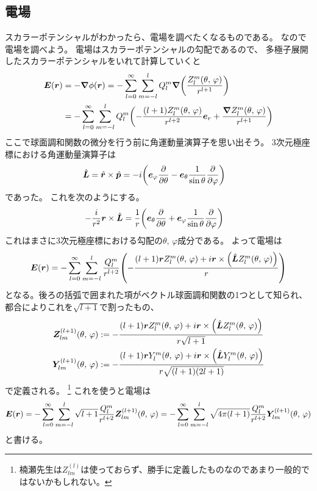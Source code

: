 \documentclass[../master.tex]{subfiles}
\begin{document}
\subsection{電場}
スカラーポテンシャルがわかったら、電場を調べたくなるものである。
なので電場を調べよう。
電場はスカラーポテンシャルの勾配であるので、
多極子展開したスカラーポテンシャルをいれて計算していくと
\begin{equation}\begin{aligned}[b]
    \vb*{E}(\vb*{r}) &= -\grad \phi(\vb*{r})
    = -\sum_{l=0}^{\infty} \sum_{m=-l}^{l} Q_l^m \grad\qty(\frac{Z_l^m(\theta,\,\varphi)}{r^{l+1}})\\
    &= -\sum_{l=0}^{\infty} \sum_{m=-l}^{l} Q_l^m \qty(-\frac{(l+1)Z_l^m(\theta,\,\varphi)}{r^{l+2}}\vb*{e}_r+\frac{\grad Z_l^m(\theta,\,\varphi)}{r^{l+1}})
\end{aligned}\end{equation}
ここで球面調和関数の微分を行う前に角運動量演算子を思い出そう。
3次元極座標における角運動量演算子は
\begin{align}
    \hat{\vb*{L}} &= \hat{\vb*{r}} \times \hat{\vb*{p}}
    = -i\qty(\vb*{e}_\varphi \pdv{\theta} -\vb*{e}_\theta \frac{1}{\sin\theta}\pdv{\varphi})
\end{align}
であった。
これを次のようにする。
\begin{align}
    -\frac{i}{r^2}\vb*{r} \times \hat{\vb*{L}} &= \frac{1}{r}\qty(\vb*{e}_\theta \pdv{\theta} +\vb*{e}_\varphi \frac{1}{\sin\theta}\pdv{\varphi})
\end{align}
これはまさに3次元極座標における勾配の\(\theta,\,\varphi\)成分である。
よって電場は
\begin{equation}
    \vb*{E}(\vb*{r}) = -\sum_{l=0}^{\infty} \sum_{m=-l}^{l}\frac{Q_l^m}{r^{l+2}}
    \qty(-\frac{(l+1)\vb*{r}Z_l^m(\theta,\,\varphi)+i\vb*{r}\times\qty(\hat{\vb*{L}}Z_l^m(\theta,\,\varphi))}{r})
\end{equation}
となる。後ろの括弧で囲まれた項がベクトル球面調和関数の1つとして知られ、
都合によりこれを\(\sqrt{l+1}\)で割ったもの、
\begin{align}
    \vb*{Z}_{lm}^{(l+1)}(\theta,\,\varphi) &:=-\frac{(l+1)\vb*{r}Z_l^m(\theta,\,\varphi)+i\vb*{r}\times\qty(\hat{\vb*{L}}Z_l^m(\theta,\,\varphi))}{r\sqrt{l+1}}\\
    \vb*{Y}_{lm}^{(l+1)}(\theta,\,\varphi) &:=-\frac{(l+1)\vb*{r}Y_l^m(\theta,\,\varphi)+i\vb*{r}\times\qty(\hat{\vb*{L}}Y_l^m(\theta,\,\varphi))}{r\sqrt{(l+1)(2l+1)}}\\
\end{align}
で定義される。
\footnote{楠瀬先生は\(Z_{lm}^{(l)}\)は使っておらず、勝手に定義したものなのであまり一般的ではないかもしれない。}
これを使うと電場は
\begin{align}
    \vb*{E}(\vb*{r})
    = -\sum_{l=0}^{\infty} \sum_{m=-l}^{l}\sqrt{l+1}\frac{Q_l^m}{r^{l+2}} \vb*{Z}_{lm}^{(l+1)}(\theta,\,\varphi)
    = -\sum_{l=0}^{\infty} \sum_{m=-l}^{l}\sqrt{4\pi(l+1)}\frac{Q_l^m}{r^{l+2}} \vb*{Y}_{lm}^{(l+1)}(\theta,\,\varphi)\\
\end{align}
と書ける。
\end{document}

